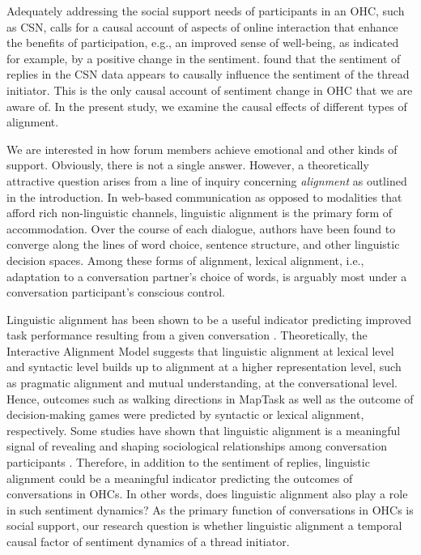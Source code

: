 Adequately addressing the social support needs of participants in an OHC, such as CSN, calls for a causal account of aspects of online interaction that enhance the benefits of participation, e.g., an improved sense of well-being, as indicated for example, by a positive change in the sentiment. \citeauthor{bui2016temporal} found that the sentiment of replies in the CSN data appears to causally influence the sentiment of the thread initiator.  This is the only causal account of sentiment change in OHC that we are aware of.
In the present study, we examine the causal effects of different types of alignment.

We are interested in how forum members achieve emotional and other kinds of support.  Obviously, there is not a single answer.  However, a theoretically attractive question arises from a line of inquiry concerning \emph{alignment} as outlined in the introduction.  In web-based communication as opposed to modalities that afford rich non-linguistic channels,  linguistic alignment is the primary form of accommodation. Over the course of each dialogue, authors have been found to converge along the lines of word choice, sentence structure, and other linguistic decision spaces. Among these forms of alignment, lexical alignment, i.e., adaptation to a conversation partner's choice of words, is arguably most under a conversation participant's conscious control.

Linguistic alignment has been shown to be a useful indicator predicting improved task performance resulting from a given conversation \parencite{reitter2007predicting}. Theoretically, the Interactive Alignment Model \parencite{pickering2004toward} suggests that linguistic alignment at lexical level and syntactic level builds up to alignment at a higher representation level, such as pragmatic alignment and mutual understanding, at the conversational level. Hence, outcomes such as walking directions in MapTask \parencite{reitter_alignment_2014} as well as the outcome of decision-making games \parencite{fusaroli2012coming} were predicted by syntactic or lexical alignment, respectively. Some studies have shown that linguistic alignment is a meaningful signal of revealing and shaping sociological relationships among conversation participants \parencite{jones2014finding}. Therefore, in addition to the sentiment of replies, linguistic alignment could be a meaningful indicator predicting the outcomes of conversations in OHCs. In other words, does linguistic alignment also play a role in such sentiment dynamics? As the primary function of conversations in OHCs is social support, our research question is whether linguistic alignment a temporal causal factor of sentiment dynamics of a thread initiator.

